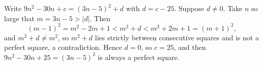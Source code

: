 Write $9n^2-30n+c=(3n-5)^2+d$ with $d=c-25$. Suppose $d\ne0$. Take $n$ so large that $m=3n-5>|d|$. Then
\[(m-1)^2=m^2-2m+1<m^2+d<m^2+2m+1=(m+1)^2,\]
and $m^2+d\ne m^2$, so $m^2+d$ lies strictly between consecutive squares and is not a perfect square, a contradiction. Hence $d=0$, so $c=\boxed{25}$, and then $9n^2-30n+25=(3n-5)^2$ is always a perfect square.
